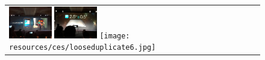 \documentclass{acm_proc_article-sp}
\newcommand{\thumbheight}{14mm}
\newenvironment{thumbsequence}{}{\makebox[4mm]{}}
\begin{document}
\begin{figure}
\begin{tabular}{p{\textwidth}}
\begin{thumbsequence}
		\includegraphics[height=\thumbheight]{resources/ces/looseduplicate4.jpg}
		\includegraphics[height=\thumbheight]{resources/ces/looseduplicate5.jpg}
	\end{thumbsequence}
	\begin{thumbsequence}
		\texttt{[image: resources/ces/looseduplicate6.jpg]}

\end{thumbsequence}
\end{tabular}
\end{figure}
\end{document}
